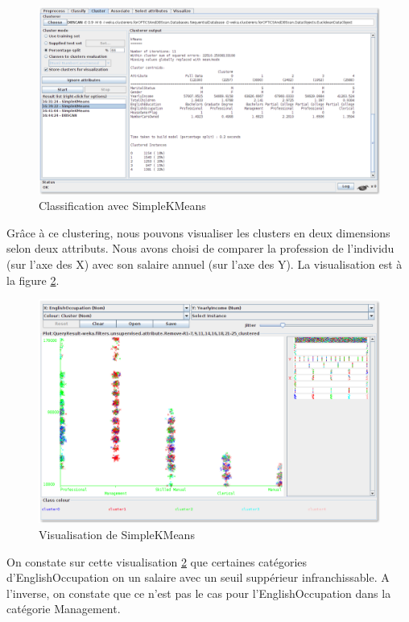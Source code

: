    \begin{figure}[H]
        \centering
        \includegraphics[width=1\linewidth, fbox]{img/clustering/kmeans_5.png}
        \caption{Classification avec SimpleKMeans}
        \label{kmeans5}
    \end{figure}

    Grâce à ce clustering, nous pouvons visualiser les clusters en deux dimensions selon deux attributs. Nous avons choisi de comparer la profession de l'individu (sur l'axe des X) avec son salaire annuel (sur l'axe des Y). La visualisation est à la figure \ref{kmeans5viz}.

    \begin{figure}[H]
        \centering
        \includegraphics[width=1\linewidth, fbox]{img/clustering/kmeans_5_viz.png}
        \caption{Visualisation de SimpleKMeans}
        \label{kmeans5viz}
    \end{figure}

    On constate sur cette visualisation \ref{kmeans5viz} que certaines catégories d'EnglishOccupation on un salaire avec un seuil suppérieur infranchissable. A l'inverse, on constate que ce n'est pas le cas pour l'EnglishOccupation dans la catégorie Management.
    \newpage

